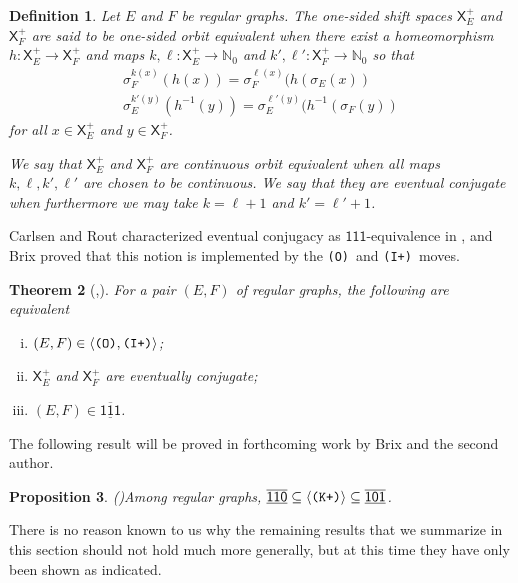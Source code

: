 \documentclass[12pt]{amsbook}%
\newcommand{\XXp}[1]{\mathsf X^+_{#1}}
\newtheorem{theor}{Theorem}[section]
\newtheorem{propo}[theor]{Proposition}
\theoremstyle{defin}
\newtheorem{defin}[theor]{Definition}
\theoremstyle{remark}
\numberwithin{equation}{chapter}
\numberwithin{theor}{section}
\newcommand{\NN}{\mathbb{N}}
\newcommand{\xyz}[1]{\mbox{$\mathsf{#1}$}}
\newcommand{\xyzrel}[1]{\mbox{$\overline{\underline{\mathsf{ #1}}}$}}
\newcommand{\IIIp}{\mbox{\texttt{\textup{(I+)}}}}
\newcommand{\OOO}{\mbox{\texttt{\textup{(O)}}}}
\newcommand{\KKKp}{\mbox{\texttt{\textup{(K+)}}}}
\begin{document}
\begin{defin}
Let $E$ and $F$ be regular graphs.  The one-sided shift spaces $\XXp E$ and $\XXp F$ are said to be \emph{one-sided orbit equivalent} when there exist a homeomorphism $h:\XXp E\to \XXp F$ and maps $k,\ell: \XXp E\to \NN_0$ and $k',\ell':\XXp F\to \NN_0$ so that
\begin{gather*}
\sigma_F^{k(x)}(h(x))=\sigma_F^{\ell(x)}(h(\sigma_E(x))\\ \sigma_E^{k'(y)}(h^{-1}(y))=\sigma_E^{\ell'(y)}(h^{-1}(\sigma_F(y))
\end{gather*}
for all $x\in \XXp E$ and $y\in \XXp F$. 

We say that $\XXp E$ and $\XXp F$ are \emph{continuous orbit equivalent} when all maps $k,\ell,k',\ell'$ are chosen to be continuous. We say that they are \emph{eventual conjugate} when 
furthermore we may take $k = \ell+1$ and $k' = \ell'+1$.
\end{defin}



Carlsen and Rout characterized eventual conjugacy as \xyz{111}-equivalence in \cite{tmcjr:dgigc}, and Brix proved that this notion is implemented by the \OOO\ and \IIIp\ moves. 
 


   \begin{theor}[\cite{tmcjr:dgigc},\cite{kab:bssebiec}]\label{B}
  For a pair $(E,F)$ of regular graphs, the following are equivalent
  \begin{enumerate}[(i)]
\item $(E,F)\in\langle \OOO,\IIIp\rangle$;
   \item $\XXp E$ and $\XXp F$ are eventually conjugate;
    \item $(E,F)\in\xyzrel{111}$.
    \end{enumerate}
  \end{theor}




The following result will be proved in forthcoming work by Brix and the second author.

\begin{propo}(\cite{kaber:use})\label{pre-mike-unital}
Among regular graphs, $\xyzrel{110}\subseteq\langle\KKKp\rangle\subseteq \xyzrel{101}$.
\end{propo}

There is no reason known to us why the remaining results that we summarize in this section should not hold much more  generally, but at  this time they have only been shown as indicated. %
\end{document}
